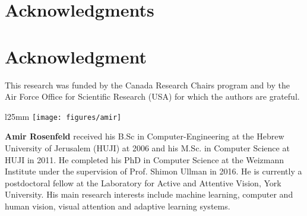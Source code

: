 \documentclass[10pt,journal,compsoc]{IEEEtran}
\begin{document}
  \section*{Acknowledgments}
\else
  \section*{Acknowledgment}
\fi


This research was funded by the Canada Research Chairs program and by the Air Force Office for Scientific Research (USA) for which the authors are grateful.






\ifCLASSOPTIONcaptionsoff
  \newpage
\fi

 \begin{wrapfigure}{l}{25mm} 
    \texttt{[image: figures/amir]}
  \end{wrapfigure}\par
  \textbf{Amir Rosenfeld} received his B.Sc in Computer-Engineering at the Hebrew University of Jerusalem (HUJI) at 2006
and his M.Sc. in Computer Science at HUJI in 2011. He completed his PhD in Computer Science at the Weizmann Institute under the supervision of Prof. Shimon Ullman in 2016. He is currently a postdoctoral fellow at the Laboratory for Active and Attentive Vision, York University. His main research interests include machine learning, computer and human vision, visual attention and adaptive learning systems.\par
\vspace{10px}
\end{document}
